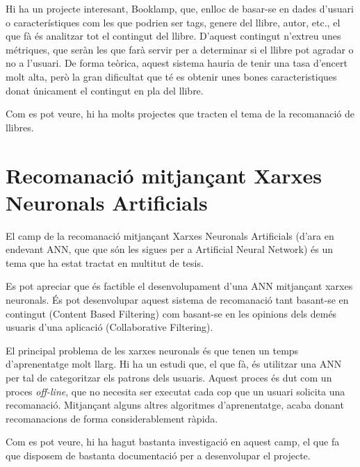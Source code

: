 Hi ha un projecte interesant, Booklamp\cite{Booklamp}, que, enlloc de basar-se en dades d'usuari o característiques com les que podrien ser tags, genere del llibre, autor, etc., el que fà és analitzar tot el contingut del llibre. D'aquest contingut n'extreu unes métriques, que seràn les que farà servir per a determinar si el llibre pot agradar o no a l'usuari. De forma teòrica, aquest sistema hauria de tenir una tasa d'encert molt alta, però la gran dificultat que té es obtenir unes bones caracteristiques donat únicament el contingut en pla del llibre.

Com es pot veure, hi ha molts projectes que tracten el tema de la recomanació de llibres.

\section{Recomanació mitjançant Xarxes Neuronals Artificials}
\label{sec:estat-de-lart-ann}

El camp de la recomanació mitjançant Xarxes Neuronals Artificials (d'ara en endevant ANN, que que són les sigues per a Artificial Neural Network) és un tema que ha estat tractat en multitut de tesis.

Es pot apreciar que és factible el desenvolupament d'una ANN mitjançant xarxes neuronals. És pot desenvolupar aquest sistema de recomanació tant basant-se en contingut (Content Based Filtering) com basant-se en les opinions dels demés usuaris d'una aplicació (Collaborative Filtering).

El principal problema de les xarxes neuronals és que tenen un temps d'aprenentatge molt llarg\cite{faster-ann-recomender}. Hi ha un estudi\cite{collaborative-filtering-som-cbr} que, el que fà, és utilitzar una ANN per tal de categoritzar els patrons dels usuaris. Aquest proces és dut com un proces \emph{off-line}, que no necesita ser executat cada cop que un usuari solicita una recomanació. Mitjançant alguns altres algoritmes d'aprenentatge, acaba donant recomanacions de forma considerablement ràpida.

Com es pot veure, hi ha hagut bastanta investigació en aquest camp, el que fa que disposem de bastanta documentació per a desenvolupar el projecte.
